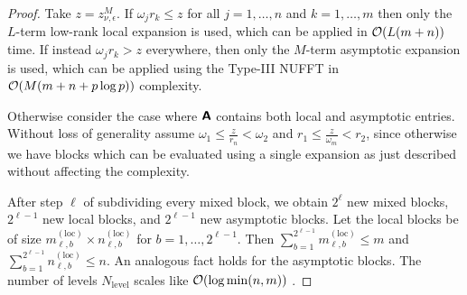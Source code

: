 \begin{proof}
    Take $z = z_{\nu, \epsilon}^M$. If $\omega_j r_k \leq z$ for all
    $j=1,\dots,n$ and $k=1,\dots,m$ then only the $L$-term low-rank local
    expansion is used, which can be applied in $\mathcal{O}(L(m + n))$ time. If instead
    $\omega_j r_k > z$ everywhere, then only the $M$-term asymptotic expansion
    is used, which can be applied using the Type-III NUFFT in $\mathcal{O}(M(m + n +
    p\log p))$ complexity.

    Otherwise consider the case where $\bm{\mathsf{A}}$ contains both local and
    asymptotic entries. Without loss of generality assume $\omega_1 \leq
    \frac{z}{r_n} < \omega_2$ and $r_1 \leq \frac{z}{\omega_m} < r_2$, since
    otherwise we have blocks which can be evaluated using a single expansion as
    just described without affecting the complexity.

    After step $\ell$ of subdividing every mixed block, we obtain $2^{\ell}$ new
    mixed blocks, $2^{\ell-1}$ new local blocks, and $2^{\ell-1}$ new asymptotic
    blocks. Let the local blocks be of size $m_{\ell,b}^{(\text{loc})} \times
    n_{\ell,b}^{(\text{loc})}$ for $b = 1,\dots,2^{\ell-1}$. Then
    $\sum_{b=1}^{2^{\ell-1}} m_{\ell,b}^{(\text{loc})} \leq m$ and
    $\sum_{b=1}^{2^{\ell-1}} n_{\ell,b}^{(\text{loc})} \leq n$. An analogous
    fact holds for the asymptotic blocks. The number of levels
    $N_{\text{level}}$ scales like $\mathcal{O}(\log\min(n,m))$ . 
    

\end{proof}
